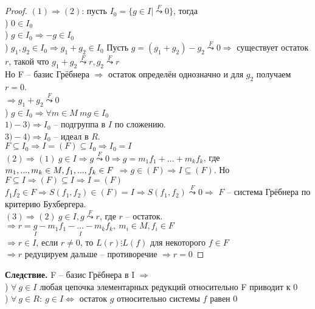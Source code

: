 \begin{proof} 
    $(1) \Rightarrow (2)$: пусть $I_0 = \{g \in I |  \overset{F}{\leadsto}0\}$, тогда \\
    ) $0 \in I_0$ \\
    ) $g \in I_0 \Rightarrow -g \in I_0$ \\
    ) $g_1, g_2 \in I_0 \Rightarrow g_1 + g_2 \in I_0$
    Пусть $g = (g_1 + g_2 ) - g_2\overset{F}{\leadsto}0\Rightarrow$ существует остаток $r$, такой что $g_1+g_2\overset{F}{\leadsto}r, g_2\overset{F}{\leadsto}r$\\
    Но F -- базис Грёбнера $\Rightarrow $ остаток определён однозначно и для $g_2$ получаем $r=0$.\\
    $\Rightarrow g_1+g_2\overset{F}{\leadsto}0$\\
    ) $g\in I_0\Rightarrow \forall m\in M\ mg\in I_0$\\
    \indent$1)-3)\Rightarrow I_0$ -- подгруппа в $I $ по сложению. \\
    \indent$3)-4)\Rightarrow I_0$ -- идеал в $R$.\\
    $F\subseteq I_0\Rightarrow I=(F)\subseteq I_0\Rightarrow I_0=I$\\
    \indent$(2)\Rightarrow (1) \ g\in I\Rightarrow g\overset{F}{\leadsto}0\Rightarrow g=m_1f_1+...+m_kf_k$, где $m_1,...,m_k\in M, f_1,...,f_k\in F\\$
    $\Rightarrow g\in (F)\Rightarrow I\subseteq (F)$. Но $F\subseteq I\Rightarrow (F)\subseteq I\Rightarrow I=(F)$\\
    $f_1f_2\in F\Rightarrow S(f_1,f_2)\in (F)=I\Rightarrow S(f_1,f_2)\overset{F}{\leadsto}0\Rightarrow$ $F$ -- система Грёбнера по критерию Бухбергера.\\
    \indent $(3)\Rightarrow (2) \ g\in I, g\overset{F}{\leadsto}r$, где $r$ -- остаток. $\Rightarrow r=\underset{I}{g}-\underset{I}{m_1f_1-...-m_kf_k}, \ m_i\in M, f_i\in F$\\
    $\Rightarrow r\in I$, если $r\neq 0$, то $L(r)\vdots L(f)$ для некоторого $f\in F$\\
    $\Rightarrow r$ редуцируем дальше -- противоречие $\Rightarrow r=0$
\end{proof}
\noindent \textbf{Следствие.} F -- базис Грёбнера в I $\Rightarrow $\\
) $\forall \ g\in I $ любая цепочка элементарных редукций относительно F приводит к 0\\
) $\forall \ g\in R:\ g\in I \Leftrightarrow $ остаток $g$ относительно системы $f$ равен 0